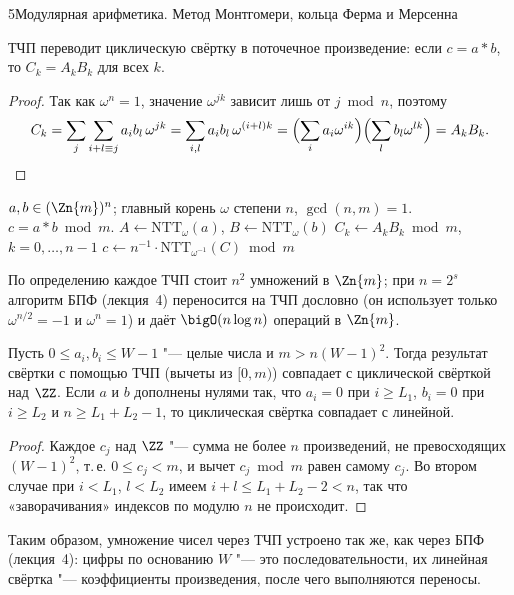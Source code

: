 \begin{lecture}{5}{Модулярная арифметика. Метод Монтгомери, кольца Ферма и Мерсенна}
\begin{theorem}[о свёртке]\label{l5:convolution}
ТЧП переводит циклическую свёртку в поточечное произведение: если $c = a * b$, то
$C_k = A_k B_k$ для всех $k$.
\end{theorem}

\begin{proof}
Так как $\omega^n = 1$, значение $\omega^{jk}$ зависит лишь от $j \bmod n$, поэтому
\[
  C_k = \sum_j \sum_{i + l \equiv j} a_i b_l\, \omega^{jk}
  = \sum_{i, l} a_i b_l\, \omega^{(i + l)k}
  = \Bigl(\sum_i a_i \omega^{ik}\Bigr)\Bigl(\sum_l b_l \omega^{lk}\Bigr) = A_k B_k. \qedhere
\]
\end{proof}

\begin{algorithm}
\begin{algorithmic}[1]
\Require $a, b \in (\Zn{m})^n$; главный корень $\omega$ степени $n$, $\gcd(n, m) = 1$.
\Ensure $c = a * b \bmod m$.
\State $A \gets \mathrm{NTT}_\omega(a)$, $B \gets \mathrm{NTT}_\omega(b)$
\State $C_k \gets A_k B_k \bmod m$, $k = 0, \dots, n - 1$
\State $c \gets n^{-1} \cdot \mathrm{NTT}_{\omega^{-1}}(C) \bmod m$
\end{algorithmic}
\end{algorithm}

По определению каждое ТЧП стоит $n^2$ умножений в $\Zn{m}$; при $n = 2^s$ алгоритм БПФ
(лекция~4) переносится на ТЧП дословно (он использует только $\omega^{n/2} = -1$ и
$\omega^n = 1$) и даёт $\bigO(n \log n)$ операций в $\Zn{m}$.

\begin{proposition}\label{l5:exact}
Пусть $0 \le a_i, b_i \le W - 1$ "--- целые числа и $m > n (W - 1)^2$. Тогда результат
свёртки с помощью ТЧП (вычеты из $[0, m)$) совпадает с циклической свёрткой над $\ZZ$. Если
$a$ и $b$ дополнены нулями так, что $a_i = 0$ при $i \ge L_1$, $b_i = 0$ при $i \ge L_2$ и
$n \ge L_1 + L_2 - 1$, то циклическая свёртка совпадает с линейной.
\end{proposition}

\begin{proof}
Каждое $c_j$ над $\ZZ$ "--- сумма не более $n$ произведений, не превосходящих $(W - 1)^2$, т.\,е.
$0 \le c_j < m$, и вычет $c_j \bmod m$ равен самому $c_j$. Во втором случае при $i < L_1$,
$l < L_2$ имеем $i + l \le L_1 + L_2 - 2 < n$, так что «заворачивания» индексов по модулю $n$
не происходит.
\end{proof}

Таким образом, умножение чисел через ТЧП устроено так же, как через БПФ (лекция~4): цифры
по основанию $W$ "--- это последовательности, их линейная свёртка "--- коэффициенты
произведения, после чего выполняются переносы.


\end{lecture}
